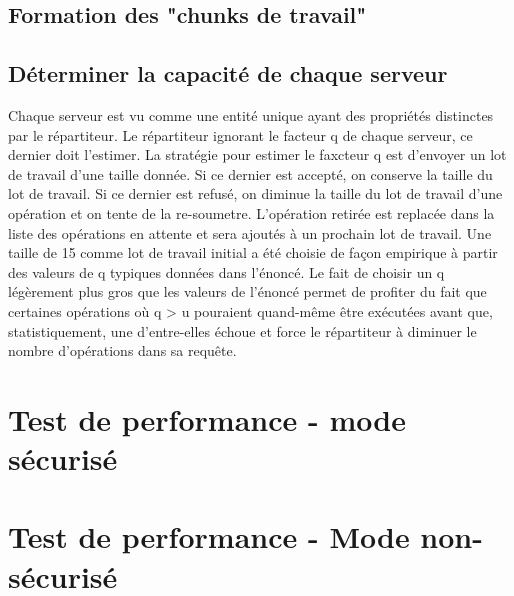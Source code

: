 \subsection{Formation des "chunks de travail"}
\subsection{Déterminer la capacité de chaque serveur }
Chaque serveur est vu comme une entité unique ayant des propriétés distinctes par le répartiteur. Le répartiteur ignorant le facteur q de chaque
serveur, ce dernier doit l'estimer. La stratégie pour estimer le faxcteur q est d'envoyer un lot de travail d'une taille donnée. Si ce dernier est accepté, on 
conserve la taille du lot de travail. Si ce dernier est refusé, on diminue la taille du lot de travail d'une opération et on tente de la re-soumetre. L'opération 
retirée est replacée dans la liste des opérations en attente et sera ajoutés à un prochain lot de travail. Une taille de 15 comme lot de travail initial a été 
choisie de façon empirique à partir des valeurs de q typiques données dans l'énoncé. Le fait de choisir un q légèrement plus gros que les valeurs de l'énoncé permet
de profiter du fait que certaines opérations où q > u pouraient quand-même être exécutées avant que, statistiquement, une d'entre-elles échoue et force le 
répartiteur à diminuer le nombre d'opérations dans sa requête. 

\section{Test de performance - mode sécurisé}

\section{Test de performance - Mode non-sécurisé}

